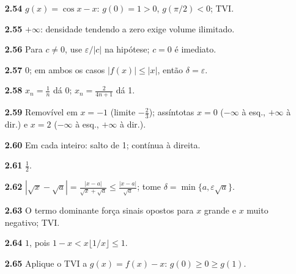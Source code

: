 {\begin{multicols}{2}
\begin{itemize}[leftmargin=2.7em,labelsep=0.5em,itemsep=1pt]
\item[\textbf{2.54}] $g(x)=\cos x-x$: $g(0)=1>0$, $g(\pi/2)<0$; TVI.
\item[\textbf{2.55}] $+\infty$: densidade tendendo a zero exige volume ilimitado.
\item[\textbf{2.56}] Para $c\neq0$, use $\varepsilon/|c|$ na hipótese; $c=0$ é imediato.
\item[\textbf{2.57}] $0$; em ambos os casos $|f(x)|\le|x|$, então $\delta=\varepsilon$.
\item[\textbf{2.58}] $x_n=\tfrac1n$ dá 0; $x_n=\tfrac2{4n+1}$ dá 1.
\item[\textbf{2.59}] Removível em $x=-1$ (limite $-\tfrac23$); assíntotas $x=0$ ($-\infty$ à esq., $+\infty$ à dir.) e $x=2$ ($-\infty$ à esq., $+\infty$ à dir.).
\item[\textbf{2.60}] Em cada inteiro: salto de 1; contínua à direita.
\item[\textbf{2.61}] $\tfrac12$.
\item[\textbf{2.62}] $|\sqrt x-\sqrt a|=\tfrac{|x-a|}{\sqrt x+\sqrt a}\le\tfrac{|x-a|}{\sqrt a}$; tome $\delta=\min\{a,\varepsilon\sqrt a\}$.
\item[\textbf{2.63}] O termo dominante força sinais opostos para $x$ grande e $x$ muito negativo; TVI.
\item[\textbf{2.64}] $1$, pois $1-x<x\lfloor1/x\rfloor\le1$.
\item[\textbf{2.65}] Aplique o TVI a $g(x)=f(x)-x$: $g(0)\ge0\ge g(1)$.
\end{itemize}\end{multicols}}

